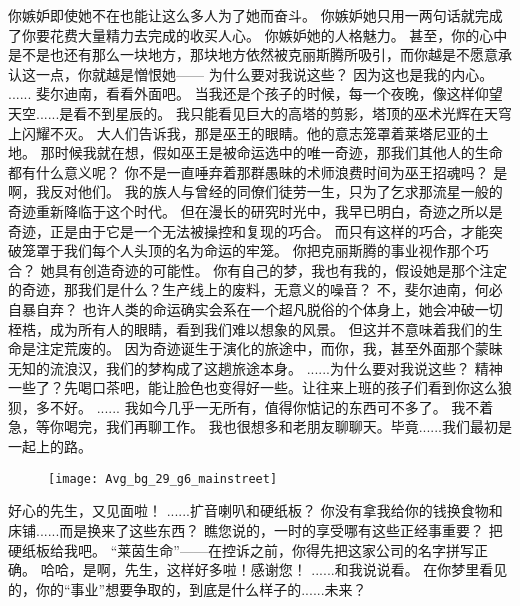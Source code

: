 \documentclass[openany]{book}
\begin{document}
\begin{dialogue}
     你嫉妒即使她不在也能让这么多人为了她而奋斗。
     你嫉妒她只用一两句话就完成了你要花费大量精力去完成的收买人心。
     你嫉妒她的人格魅力。
     甚至，你的心中是不是也还有那么一块地方，那块地方依然被克丽斯腾所吸引，而你越是不愿意承认这一点，你就越是憎恨她——
     为什么要对我说这些？
     因为这也是我的内心。
     ......
     斐尔迪南，看看外面吧。
     当我还是个孩子的时候，每一个夜晚，像这样仰望天空......是看不到星辰的。
     我只能看见巨大的高塔的剪影，塔顶的巫术光辉在天穹上闪耀不灭。
     大人们告诉我，那是巫王的眼睛。他的意志笼罩着莱塔尼亚的土地。
     那时候我就在想，假如巫王是被命运选中的唯一奇迹，那我们其他人的生命都有什么意义呢？
     你不是一直唾弃着那群愚昧的术师浪费时间为巫王招魂吗？
     是啊，我反对他们。
     我的族人与曾经的同僚们徒劳一生，只为了乞求那流星一般的奇迹重新降临于这个时代。
     但在漫长的研究时光中，我早已明白，奇迹之所以是奇迹，正是由于它是一个无法被操控和复现的巧合。
     而只有这样的巧合，才能突破笼罩于我们每个人头顶的名为命运的牢笼。
     你把克丽斯腾的事业视作那个巧合？
     她具有创造奇迹的可能性。
     你有自己的梦，我也有我的，假设她是那个注定的奇迹，那我们是什么？生产线上的废料，无意义的噪音？
     不，斐尔迪南，何必自暴自弃？
     也许人类的命运确实会系在一个超凡脱俗的个体身上，她会冲破一切桎梏，成为所有人的眼睛，看到我们难以想象的风景。
     但这并不意味着我们的生命是注定荒废的。
     因为奇迹诞生于演化的旅途中，而你，我，甚至外面那个蒙昧无知的流浪汉，我们的梦构成了这趟旅途本身。
     ......为什么要对我说这些？
     精神一些了？先喝口茶吧，能让脸色也变得好一些。让往来上班的孩子们看到你这么狼狈，多不好。
     ......
     我如今几乎一无所有，值得你惦记的东西可不多了。
     我不着急，等你喝完，我们再聊工作。
     我也很想多和老朋友聊聊天。毕竟......我们最初是一起上的路。
    \begin{figure}[h]
        \centering
        \texttt{[image: Avg\_bg\_29\_g6\_mainstreet]}
    \end{figure}
     好心的先生，又见面啦！
     ......扩音喇叭和硬纸板？
     你没有拿我给你的钱换食物和床铺......而是换来了这些东西？
     瞧您说的，一时的享受哪有这些正经事重要？
     把硬纸板给我吧。
     “莱茵生命”——在控诉之前，你得先把这家公司的名字拼写正确。
     哈哈，是啊，先生，这样好多啦！感谢您！
     ......和我说说看。
     在你梦里看见的，你的“事业”想要争取的，到底是什么样子的......未来？
\end{dialogue}
\end{document}
